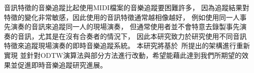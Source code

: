 \documentclass[class=NCU_thesis, crop=false]{standalone}
\begin{document}
音訊特徵的音樂追蹤比起使用MIDI檔案的音樂追蹤要困難許多，
因為追蹤結果對特徵的變化非常敏感，因此使用的音訊特徵通常越相像越好，
例如使用同一人事先演奏的音訊來追蹤同一人的現場演奏，
但通常使用者並不會特意去錄製事先演奏的音訊，尤其是在沒有合奏者的情況下，
因此本研究致力於研究使用不同音訊特徵來追蹤現場演奏的即時音樂追蹤系統。
本研究將基於~\cite{Lin2020AHumanComputerDuetSystem}所提出的架構進行重新實現
並針對ODTW演算法與部分方法進行改動，希望能藉此達到我們所期望的效果並促進即時音樂追蹤研究進展。


\pagebreak
\end{document}
